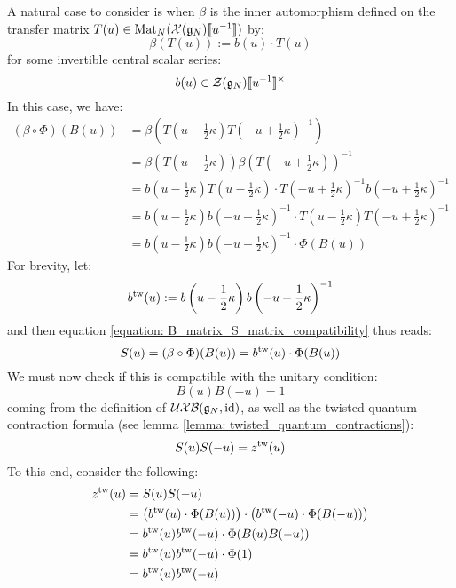         A natural case to consider is when $\beta$ is the inner automorphism defined on the transfer matrix $T(u) \in \operatorname{Mat}_N( \mathcal{X}(\mathfrak{g}_N)[\![u^{-1}]\!] )$ by:
            $$\beta( T(u) ) := b(u) \cdot T(u)$$
        for some invertible central scalar series:
            $$b(u) \in \calZ(\g_N)[\![u^{-1}]\!]^{\x}$$
        In this case, we have:
            $$
                \begin{aligned}
                    (\beta \circ \Phi)( B(u) ) & = \beta\left( T\left(u - \frac12 \kappa\right) T\left(-u + \frac12 \kappa\right)^{-1} \right)
                    \\
                    & = \beta\left( T\left(u - \frac12 \kappa\right) \right) \beta\left( T\left(-u + \frac12 \kappa\right) \right)^{-1}
                    \\
                    & = b\left(u - \frac12 \kappa\right) T\left(u - \frac12 \kappa\right) \cdot T\left(-u + \frac12 \kappa\right)^{-1} b\left(-u + \frac12 \kappa\right)^{-1}
                    \\
                    & = b\left(u - \frac12 \kappa\right) b\left(-u + \frac12 \kappa\right)^{-1} \cdot T\left(u - \frac12 \kappa\right) T\left(-u + \frac12 \kappa\right)^{-1}
                    \\
                    & = b\left(u - \frac12 \kappa\right) b\left(-u + \frac12 \kappa\right)^{-1} \cdot \Phi( B(u) )
                \end{aligned}
            $$
        For brevity, let:
            $$b^{\mathrm{tw}}(u) := b\left(u - \frac12 \kappa\right) b\left(-u + \frac12 \kappa\right)^{-1}$$
        and then equation \eqref{equation: B_matrix_S_matrix_compatibility} thus reads:
            $$S(u) = (\beta \circ \Phi)( B(u) ) = b^{\mathrm{tw}}(u) \cdot \Phi( B(u) )$$
        We must now check if this is compatible with the unitary condition:
            $$B(u) B(-u) = 1$$
        coming from the definition of $\mathcal{UXB}(\mathfrak{g}_N, \mathrm{id})$, as well as the twisted quantum contraction formula (see lemma \ref{lemma: twisted_quantum_contractions}):
            $$S(u) S(-u) = z^{\mathrm{tw}}(u)$$
        To this end, consider the following:
            $$
                \begin{aligned}
                    z^{\mathrm{tw}}(u) & = S(u) S(-u)
                    \\
                    & = \left( b^{\mathrm{tw}}(u) \cdot \Phi( B(u) ) \right) \cdot \left( b^{\mathrm{tw}}(-u) \cdot \Phi( B(-u) ) \right)
                    \\
                    & = b^{\mathrm{tw}}(u) b^{\mathrm{tw}}(-u) \cdot \Phi( B(u) B(-u) )
                    \\
                    & = b^{\mathrm{tw}}(u) b^{\mathrm{tw}}(-u) \cdot \Phi(1)
                    \\
                    & = b^{\mathrm{tw}}(u) b^{\mathrm{tw}}(-u)
                \end{aligned}
            $$

